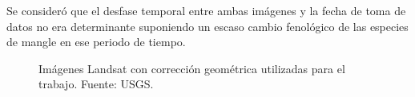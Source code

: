 Se consideró que el desfase temporal entre ambas imágenes y la fecha de toma de datos no era determinante suponiendo un escaso cambio fenológico de las especies de mangle en ese periodo de tiempo.\Sep

\begin{figure}
	\centering
	\caption[Imágenes Landsat]{Imágenes Landsat con corrección geométrica utilizadas para el trabajo. Fuente: USGS.}
	\label{fig:imagenesLandsat}
\end{figure}

